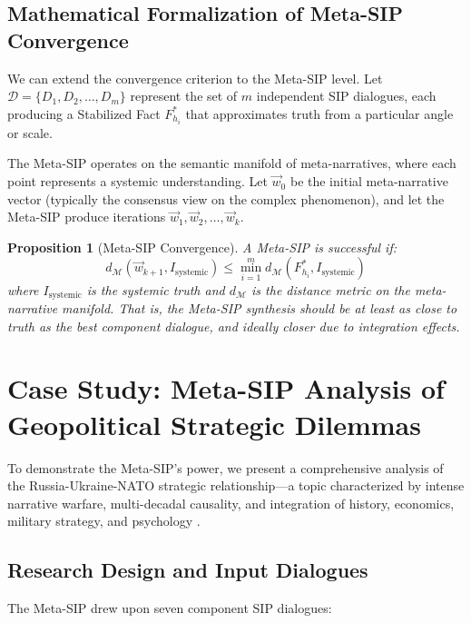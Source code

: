 \documentclass[11pt,a4paper]{article}
\newtheorem{proposition}{Proposition}[section]
\begin{document}
\subsection{Mathematical Formalization of Meta-SIP Convergence}

We can extend the convergence criterion to the Meta-SIP level. Let $\mathcal{D} = \{D_1, D_2, \ldots, D_m\}$ represent the set of $m$ independent SIP dialogues, each producing a Stabilized Fact $F_{h_i}^*$ that approximates truth from a particular angle or scale.

The Meta-SIP operates on the semantic manifold of meta-narratives, where each point represents a systemic understanding. Let $\vec{w}_0$ be the initial meta-narrative vector (typically the consensus view on the complex phenomenon), and let the Meta-SIP produce iterations $\vec{w}_1, \vec{w}_2, \ldots, \vec{w}_k$.

\begin{proposition}[Meta-SIP Convergence]
A Meta-SIP is successful if:
\begin{equation}
d_{\mathcal{M}}(\vec{w}_{k+1}, I_{\text{systemic}}) \leq \min_{i=1}^m d_{\mathcal{M}}(F_{h_i}^*, I_{\text{systemic}})
\label{eq:metasip_convergence}
\end{equation}
where $I_{\text{systemic}}$ is the systemic truth and $d_{\mathcal{M}}$ is the distance metric on the meta-narrative manifold. That is, the Meta-SIP synthesis should be at least as close to truth as the best component dialogue, and ideally closer due to integration effects.
\end{proposition}

\section{Case Study: Meta-SIP Analysis of Geopolitical Strategic Dilemmas}

To demonstrate the Meta-SIP's power, we present a comprehensive analysis of the Russia-Ukraine-NATO strategic relationship---a topic characterized by intense narrative warfare, multi-decadal causality, and integration of history, economics, military strategy, and psychology \citep{metasip_dialogue}.

\subsection{Research Design and Input Dialogues}

The Meta-SIP drew upon seven component SIP dialogues:
\end{document}
